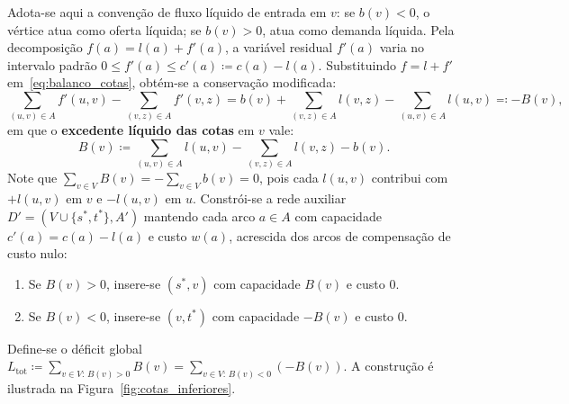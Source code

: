 Adota-se aqui a convenção de fluxo líquido de entrada em $v$: se $b(v) < 0$, o vértice atua como oferta líquida; se $b(v) > 0$, atua como demanda líquida. Pela decomposição $f(a) = l(a) + f'(a)$, a variável residual $f'(a)$ varia no intervalo padrão $0 \le f'(a) \le c'(a) \coloneqq c(a) - l(a)$. Substituindo $f = l + f'$ em~\eqref{eq:balanco_cotas}, obtém-se a conservação modificada:
\begin{equation}\label{eq:balanco_aux}
    \sum_{(u, v) \in A} f'(u, v) - \sum_{(v, z) \in A} f'(v, z) = b(v) + \sum_{(v, z) \in A} l(v, z) - \sum_{(u, v) \in A} l(u, v) \eqqcolon -B(v),
\end{equation}
em que o \textbf{excedente líquido das cotas} em $v$ vale:
\begin{equation}
    B(v) \coloneqq \sum_{(u, v) \in A} l(u, v) - \sum_{(v, z) \in A} l(v, z) - b(v).
\end{equation}
Note que $\sum_{v \in V} B(v) = -\sum_{v \in V} b(v) = 0$, pois cada $l(u, v)$ contribui com $+l(u, v)$ em $v$ e $-l(u, v)$ em $u$. Constrói-se a rede auxiliar $D' = (V \cup \{s^*, t^*\}, A')$ mantendo cada arco $a \in A$ com capacidade $c'(a) = c(a) - l(a)$ e custo $w(a)$, acrescida dos arcos de compensação de custo nulo:
\begin{enumerate}
    \item Se $B(v) > 0$, insere-se $(s^*, v)$ com capacidade $B(v)$ e custo $0$.
    \item Se $B(v) < 0$, insere-se $(v, t^*)$ com capacidade $-B(v)$ e custo $0$.
\end{enumerate}
Define-se o déficit global $L_{\text{tot}} \coloneqq \sum_{v \in V:\, B(v) > 0} B(v) = \sum_{v \in V:\, B(v) < 0} (-B(v))$. A construção é ilustrada na Figura~\ref{fig:cotas_inferiores}.

